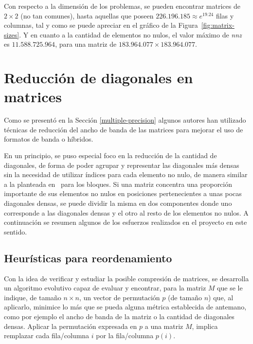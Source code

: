 Con respecto a la dimensión de los problemas, se pueden encontrar matrices de $2\times 2$ (no tan comunes), hasta aquellas que poseen $226.196.185 \approx e^{19.24}$	filas y columnas, tal y como se puede apreciar en el gráfico de la Figura~\ref{fig:matrix-sizes}. Y en cuanto a la cantidad de elementos no nulos, el valor máximo de \textit{nnz} es $11.588.725.964$, para una matriz de $183.964.077\times183.964.077$.



\section{Reducción de diagonales en matrices}\label{sec:ae}

Como se presentó en la Sección \ref{multiple-precision} algunos autores han utilizado técnicas de reducción del ancho de banda de las matrices para mejorar el uso de formatos de banda o híbridos. 

En un principio, se puso especial foco en la reducción de la cantidad de diagonales, de forma de poder agrupar y representar las diagonales más densas sin la necesidad de utilizar índices para cada elemento no nulo, de manera similar a la planteada en~\cite{Pinar1999} para los bloques. Si una matriz concentra una proporción importante de sus elementos no nulos en posiciones pertenecientes
a unas pocas diagonales densas, se puede dividir la misma  en dos componentes donde uno corresponde a las diagonales densas y el otro al resto de los elementos no nulos.
A continuación se resumen algunos de los esfuerzos realizados en el proyecto en este sentido.


\subsection{Heurísticas para reordenamiento}

Con la idea de verificar y estudiar la posible compresión de matrices, se desarrolla un algoritmo evolutivo capaz de evaluar y encontrar, para la matriz $M$ que se le indique, de tamaño $n \times n$, un vector de permutación $p$ (de tamaño $n$) que, al aplicarlo, minimice lo más que se pueda alguna métrica establecida de antemano, como por ejemplo el ancho de banda de la matriz o la cantidad de diagonales densas. Aplicar la permutación expresada en $p$ a una matriz $M$, implica remplazar cada fila/columna $i$ por la fila/columna $p(i)$. %

